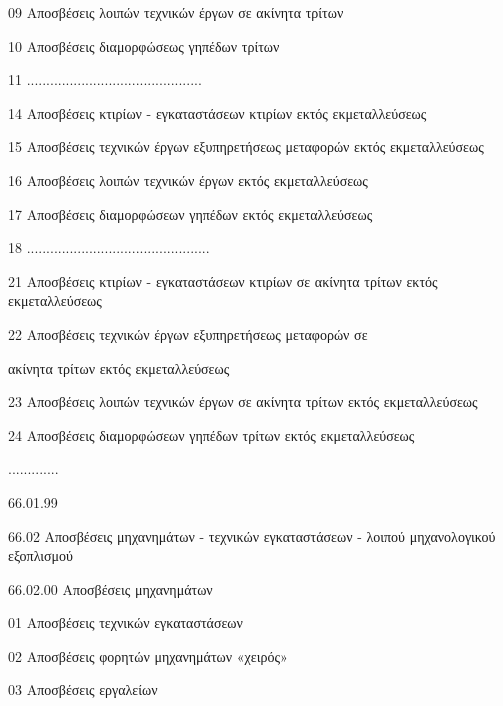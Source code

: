 \documentclass[A4,10pt,greek]{book}
\begin{document}
                               09   Αποσβέσεις λοιπών τεχνικών έργων σε ακίνητα τρίτων

                               10   Αποσβέσεις διαμορφώσεως γηπέδων τρίτων

                               11   .............................................

                               14   Αποσβέσεις κτιρίων - εγκαταστάσεων κτιρίων
                                       εκτός εκμεταλλεύσεως

                               15   Αποσβέσεις τεχνικών έργων εξυπηρετήσεως μεταφορών εκτός
                                       εκμεταλλεύσεως

                               16   Αποσβέσεις λοιπών τεχνικών έργων εκτός εκμεταλλεύσεως

                               17   Αποσβέσεις διαμορφώσεων γηπέδων εκτός εκμεταλλεύσεως

                               18   ...............................................

                               21   Αποσβέσεις κτιρίων - εγκαταστάσεων κτιρίων σε ακίνητα
                                       τρίτων εκτός εκμεταλλεύσεως

                               22   Αποσβέσεις τεχνικών έργων εξυπηρετήσεως μεταφορών σε

                                       ακίνητα τρίτων εκτός εκμεταλλεύσεως

                               23   Αποσβέσεις λοιπών τεχνικών έργων σε ακίνητα τρίτων εκτός
                                       εκμεταλλεύσεως

                               24   Αποσβέσεις διαμορφώσεων γηπέδων τρίτων
                                       εκτός εκμεταλλεύσεως

                     .............

                     66.01.99

        66.02   Αποσβέσεις μηχανημάτων - τεχνικών εγκαταστάσεων - λοιπού
                     μηχανολογικού εξοπλισμού

                     66.02.00   Αποσβέσεις μηχανημάτων

                               01   Αποσβέσεις τεχνικών εγκαταστάσεων

                               02   Αποσβέσεις φορητών μηχανημάτων «χειρός»

                               03   Αποσβέσεις εργαλείων
\end{document}
